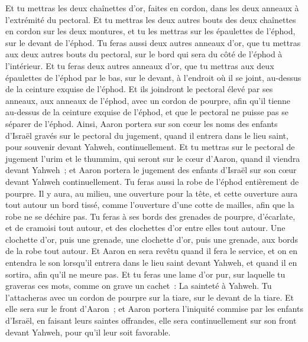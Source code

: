 \begin{multicols}{2}
Et tu mettras les deux chaînettes d'or, faites en cordon, dans les deux anneaux à l'extrémité du pectoral.
Et tu mettras les deux autres bouts des deux chaînettes en cordon sur les deux montures, et tu les mettras sur les épaulettes de l'éphod, sur le devant de l'éphod.
Tu feras aussi deux autres anneaux d'or, que tu mettras aux deux autres bouts du pectoral, sur le bord qui sera du côté de l'éphod à l'intérieur.
Et tu feras deux autres anneaux d'or, que tu mettras aux deux épaulettes de l'éphod par le bas, sur le devant, à l'endroit où il se joint, au-dessus de la ceinture exquise de l'éphod.
Et ils joindront le pectoral élevé par ses anneaux, aux anneaux de l'éphod, avec un cordon de pourpre, afin qu'il tienne au-dessus de la ceinture exquise de l'éphod, et que le pectoral ne puisse pas se séparer de l'éphod.
Ainsi, Aaron portera sur son cœur les noms des enfants d'Israël gravés sur le pectoral du jugement, quand il entrera dans le lieu saint, pour souvenir devant Yahweh, continuellement.
Et tu mettras sur le pectoral de jugement l'urim et le thummim, qui seront sur le cœur d'Aaron, quand il viendra devant Yahweh~; et Aaron portera le jugement des enfants d'Israël sur son cœur devant Yahweh continuellement.
Tu feras aussi la robe de l'éphod entièrement de pourpre.
Il y aura, au milieu, une ouverture pour la tête, et cette ouverture aura tout autour un bord tissé, comme l'ouverture d'une cotte de mailles, afin que la robe ne se déchire pas.
Tu feras à ses bords des grenades de pourpre, d'écarlate, et de cramoisi tout autour, et des clochettes d'or entre elles tout autour.
Une clochette d'or, puis une grenade, une clochette d'or, puis une grenade, aux bords de la robe tout autour.
Et Aaron en sera revêtu quand il fera le service, et on en entendra le son lorsqu'il entrera dans le lieu saint devant Yahweh, et quand il en sortira, afin qu'il ne meure pas.
Et tu feras une lame d'or pur, sur laquelle tu graveras ces mots, comme on grave un cachet~: La sainteté à Yahweh.
Tu l'attacheras avec un cordon de pourpre sur la tiare, sur le devant de la tiare.
Et elle sera sur le front d'Aaron~; et Aaron portera l'iniquité commise par les enfants d'Israël, en faisant leurs saintes offrandes, elle sera continuellement sur son front devant Yahweh, pour qu'il leur soit favorable.

\end{multicols}
